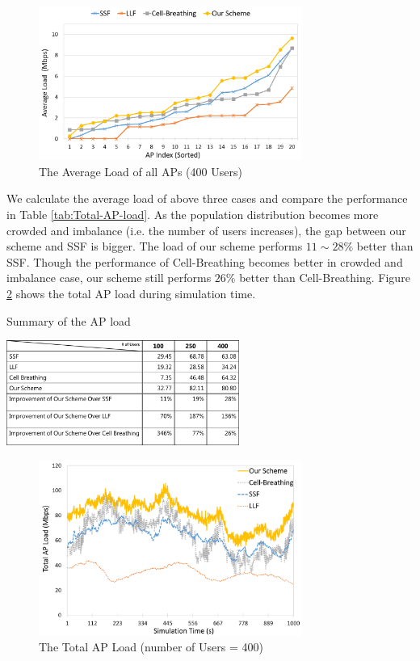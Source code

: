 \begin{figure}[tbp]
\setlength{\abovecaptionskip}{0pt}
\setlength{\belowcaptionskip}{0pt}
\begin{center}
\includegraphics[width=3.4in]{images/Average_AP_load_400.png}
\end{center}
\caption{The Average Load of all APs (400 Users)}
\label{fig:fig4_2c}
\end{figure}

We calculate the average load of above three cases and compare the performance in Table \ref{tab:Total-AP-load}. As the population distribution becomes more crowded and imbalance (i.e. the number of users increases), the gap between our scheme and SSF is bigger. The load of our scheme performs $11\sim28\%$ better than SSF. Though the performance of Cell-Breathing becomes better in crowded and imbalance case, our scheme still performs $26\%$ better than Cell-Breathing. Figure \ref{fig:Total-AP-load} shows the total AP load during simulation time.

\begin{table}[tbp]
\setlength{\belowcaptionskip}{15pt}
\centering
\caption{Summary of the AP load}
\label{tab:Total-AP-load}
\includegraphics[width=3in]{images/table4_3.png}
\end{table}

\begin{figure}[tbp]
\begin{center}
\includegraphics[width=3.4in]{images/Total_AP_load.png}
\end{center}
\caption{The Total AP Load (number of Users = 400)}
\label{fig:Total-AP-load}
\end{figure}

